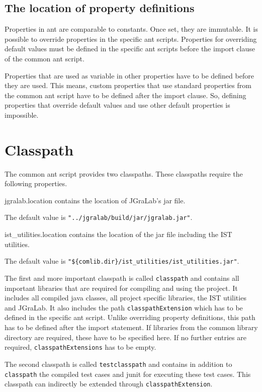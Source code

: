 \documentclass[a4paper,twoside,11pt,bibtotoc]{article}
\begin{document}
\subsection{The location of property definitions}
Properties in ant are comparable to constants.
Once set, they are immutable.
It is possible to override properties in the specific ant scripts.
Properties for overriding default values must be defined in the specific ant scripts before the import clause of the common ant script.

Properties that are used as variable in other properties have to be defined before they are used.
This means, custom properties that use standard properties from the common ant script have to be defined after the import clause.
So, defining properties that override default values and use other default properties is impossible.

\section{Classpath}
\label{sec:classpath}
The common ant script provides two classpaths.
These classpaths require the following properties.

\begin{description*}
	\item[jgralab.location] contains the location of JGraLab's jar file.\par The default value is \texttt{"../jgralab/build/jar/jgralab.jar"}.
	\item[ist\_utilities.location] contains the location of the jar file including the IST utilities.\par The default value is \texttt{"\$\{comlib.dir\}/ist\_utilities/ist\_utilities.jar"}.
\end{description*}

The first and more important classpath is called \texttt{classpath} and contains all important libraries that are required for compiling and using the project.
It includes all compiled java classes, all project specific libraries, the IST utilities and JGraLab.
It also includes the path \texttt{classpathExtension} which has to be defined in the specific ant script.
Unlike overriding property definitions, this path has to be defined after the import statement.
If libraries from the common library directory are required, these have to be specified here.
If no further entries are required, \texttt{classpathExtensions} has to be empty.

The second classpath is called \texttt{testclasspath} and contains in addition to \texttt{classpath} the compiled test cases and junit for executing these test cases.
This classpath can indirectly be extended through \texttt{classpathExtension}.
\end{document}
